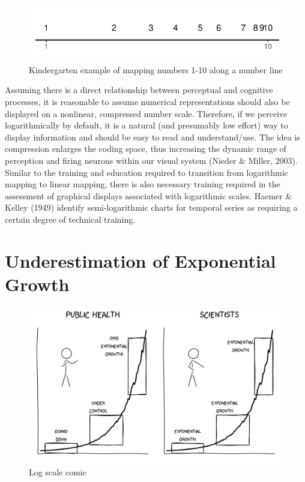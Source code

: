 \documentclass[print]{nuthesis}
\begin{document}
\begin{figure}[tbp]

{\centering \includegraphics[width=0.65\linewidth,]{thesis_files/figure-latex/log-number-line-1} 

}

\caption{Kindergarten example of mapping numbers 1-10 along a number line}\label{fig:log-number-line}
\end{figure}

Assuming there is a direct relationship between perceptual and cognitive processes, it is reasonable to assume numerical representations should also be displayed on a nonlinear, compressed number scale. Therefore, if we perceive logarithmically by default, it is a natural (and presumably low effort) way to display information and should be easy to read and understand/use.
The idea is compression enlarges the coding space, thus increasing the dynamic range of perception and firing neurons within our visual system (Nieder \& Miller, 2003).
Similar to the training and education required to transition from logarithmic mapping to linear mapping, there is also necessary training required in the assessment of graphical displays associated with logarithmic scales. Haemer \& Kelley (1949) identify semi-logarithmic charts for temporal series as requiring a certain degree of technical training.

\hypertarget{underestimation}{%
\section{Underestimation of Exponential Growth}\label{underestimation}}

\begin{figure}[tbp]

{\centering \includegraphics[width=1\linewidth,]{images/exponential-stages-comic} 

}

\caption{Log scale comic}\label{fig:exponential-stages-comic}
\end{figure}
\end{document}
